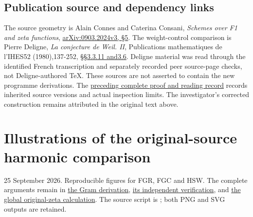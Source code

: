 \section{Publication source and dependency
links}\label{publication-source-and-dependency-links-20}

The source geometry is Alain Connes and Caterina Consani, \emph{Schemes
over F1 and zeta functions},
\href{https://arxiv.org/abs/0903.2024v3}{arXiv:0903.2024v3, §5}. The
weight-control comparison is Pierre Deligne, \emph{La conjecture de
Weil. II}, Publications mathematiques de l'IHES52 (1980),137-252,
\href{https://www.numdam.org/item/PMIHES_1980__52__137_0/}{§§3.3.11
and3.6}. Deligne material was read through the identified French
transcription and separately recorded peer source-page checks, not
Deligne-authored TeX. These sources are not asserted to contain the new
programme derivations. The
\href{https://github.com/KokunoYumeto/zeta-function-research-reader/blob/36a82ecca98addb8a98b48204e349737856c7223/workbenches/splitzero-tandem/continuations/20260924-cohomology-weight-and-character-lifts/BUILD_AND_REVIEW.md}{preceding
complete proof and reading record} records inherited source versions and
actual inspection limits. The investigator's corrected construction
remains attributed in the original text above.

\chapter{Illustrations of the original-source harmonic
comparison}\label{illustrations-of-the-original-source-harmonic-comparison}

25 September 2026. Reproducible figures for FGR, FGC and HSW. The
complete arguments remain in
\href{https://github.com/KokunoYumeto/zeta-function-research-reader/blob/main/workbenches/splitzero-tandem/continuations/20260925-full-source-tensor-and-original-divisor/counterfactual/FULL_GRAM_RESONANCE_RETURN.md}{the
Gram derivation},
\href{https://github.com/KokunoYumeto/zeta-function-research-reader/blob/main/workbenches/splitzero-tandem/continuations/20260925-full-source-tensor-and-original-divisor/counterfactual/FGR_INDEPENDENT_CHECK.md}{its
independent verification}, and
\href{https://github.com/KokunoYumeto/zeta-function-research-reader/blob/main/workbenches/splitzero-tandem/continuations/20260925-full-source-tensor-and-original-divisor/counterfactual/ORIGINAL_ZETA_HARMONIC_SWEEP_AND_OFFCRITICAL_DEFECT.md}{the
global original-zeta calculation}. The source script is
; both PNG and SVG outputs are
retained.

